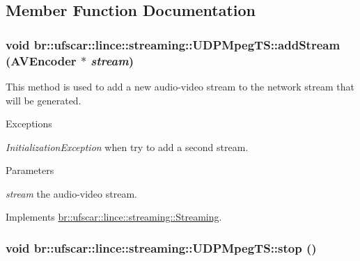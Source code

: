 \subsection{Member Function Documentation}
\hypertarget{classbr_1_1ufscar_1_1lince_1_1streaming_1_1UDPMpegTS_a8dc5c2ece80e7cf6c94e10582b78de40}{
\subsubsection[{addStream}]{\setlength{\rightskip}{0pt plus 5cm}void br::ufscar::lince::streaming::UDPMpegTS::addStream ({\bf AVEncoder} $\ast$ {\em stream})}}
\label{classbr_1_1ufscar_1_1lince_1_1streaming_1_1UDPMpegTS_a8dc5c2ece80e7cf6c94e10582b78de40}


This method is used to add a new audio-\/video stream to the network stream that will be generated. 


\begin{DoxyExceptions}{Exceptions}
\item[{\em InitializationException}]when try to add a second stream. \end{DoxyExceptions}

\begin{DoxyParams}{Parameters}
\item[{\em stream}]the audio-\/video stream. \end{DoxyParams}


Implements \hyperlink{classbr_1_1ufscar_1_1lince_1_1streaming_1_1Streaming_ab2739b46d9bd285d4d64100b9d5bb796}{br::ufscar::lince::streaming::Streaming}.

\hypertarget{classbr_1_1ufscar_1_1lince_1_1streaming_1_1UDPMpegTS_a38862cf512770e1a94df17d013744646}{
\subsubsection[{stop}]{\setlength{\rightskip}{0pt plus 5cm}void br::ufscar::lince::streaming::UDPMpegTS::stop ()}}
\label{classbr_1_1ufscar_1_1lince_1_1streaming_1_1UDPMpegTS_a38862cf512770e1a94df17d013744646}


